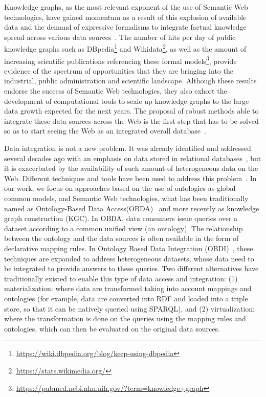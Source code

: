 Knowledge graphs, as the most relevant exponent of the use of Semantic Web technologies, have gained momentum as a result of this explosion of available data and the demand of expressive formalisms to integrate factual knowledge spread across various data sources~\citep{abs-2003-02320}. The number of hits per day of public knowledge graphs such as DBpedia\footnote{\url{https://wiki.dbpedia.org/blog/keep-using-dbpedia}} and Wikidata\footnote{\url{https://stats.wikimedia.org/}}, as well as the amount of increasing scientific publications referencing these formal models\footnote{\url{https://pubmed.ncbi.nlm.nih.gov/?term=knowledge+graph}}, provide evidence of the spectrum of opportunities that they are bringing into the industrial, public administration and scientific landscape. Although these results endorse the success of Semantic Web technologies, they also exhort the development of computational tools to scale up knowledge graphs to the large data growth expected for the next years. The proposal of robust methods able to integrate these data sources across the Web is the first step that has to be solved so as to start seeing the Web as an integrated overall database~\citep{bizer2011linked}.


Data integration is not a new problem. It was already identified and addressed several decades ago with an emphasis on data stored in relational databases~\citep{wiederhold1992mediators}, but it is exacerbated by the availability of such amount of heterogeneous data on the Web. Different techniques and tools have been used to address this problem~\citep{gruser1998wrapper,Lenzerini02,Halevy18}. In our work, we focus on approaches based on the use of ontologies as global common models, and Semantic Web technologies, what has been traditionally named as Ontology-Based Data Access(OBDA)~\citep{poggi2008linking} and more recently as knowledge graph construction (KGC). In OBDA, data consumers issue queries over a dataset according to a common unified view (an ontology). The relationship between the ontology and the data sources is often available in the form of declarative mapping rules. In Ontology Based Data Integration (OBDI)~\citep{poggi2008linking}, these techniques are expanded to address heterogeneous datasets, whose data need to be integrated to provide answers to these queries. Two different alternatives have traditionally existed to enable this type of data access and integration: (1) materialization: where data are transformed taking into account mappings and ontologies (for example, data are converted into RDF and loaded into a triple store, so that it can be natively queried using SPARQL), and (2) virtualization: where the transformation is done on the queries using the mapping rules and ontologies, which can then be evaluated on the original data sources. 


